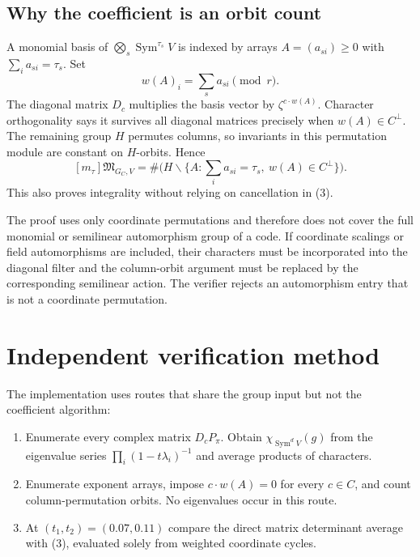 \documentclass[11pt]{article}
\newcommand{\Sym}{\operatorname{Sym}}\newcommand{\Cyc}{\operatorname{Cyc}}\newcommand{\PASS}{\textcolor{passgreen}{\textbf{PASS}}}
\begin{document}
\subsection{Why the coefficient is an orbit count}
A monomial basis of $\bigotimes_s\Sym^{\tau_s}V$ is indexed by arrays $A=(a_{si})\geq0$ with $\sum_i a_{si}=\tau_s$.  Set
\[
 w(A)_i=\sum_s a_{si}\pmod r.
\]
The diagonal matrix $D_c$ multiplies the basis vector by $\zeta^{c\cdot w(A)}$.  Character orthogonality says it survives all diagonal matrices precisely when $w(A)\in C^\perp$.  The remaining group $H$ permutes columns, so invariants in this permutation module are constant on $H$-orbits.  Hence
\begin{equation}
 \boxed{[m_\tau]\mathfrak M_{G_C,V}
 =\#\bigl(H\backslash\{A:\sum_i a_{si}=\tau_s,\ w(A)\in C^\perp\}\bigr).} \tag{4}
\end{equation}
This also proves integrality without relying on cancellation in (3).

The proof uses only coordinate permutations and therefore does not cover the
full monomial or semilinear automorphism group of a code.  If coordinate
scalings or field automorphisms are included, their characters must be
incorporated into the diagonal filter and the column-orbit argument must be
replaced by the corresponding semilinear action.  The verifier rejects an
automorphism entry that is not a coordinate permutation.

\section{Independent verification method}
The implementation uses routes that share the group input but not the coefficient algorithm:
\begin{enumerate}[leftmargin=*]
\item Enumerate every complex matrix $D_cP_\pi$.  Obtain $\chi_{\Sym^dV}(g)$ from the eigenvalue series $\prod_i(1-t\lambda_i)^{-1}$ and average products of characters.
\item Enumerate exponent arrays, impose $c\cdot w(A)=0$ for every $c\in C$, and count column-permutation orbits.  No eigenvalues occur in this route.
\item At $(t_1,t_2)=(0.07,0.11)$ compare the direct matrix determinant average with (3), evaluated solely from weighted coordinate cycles.
\end{enumerate}
\end{document}
